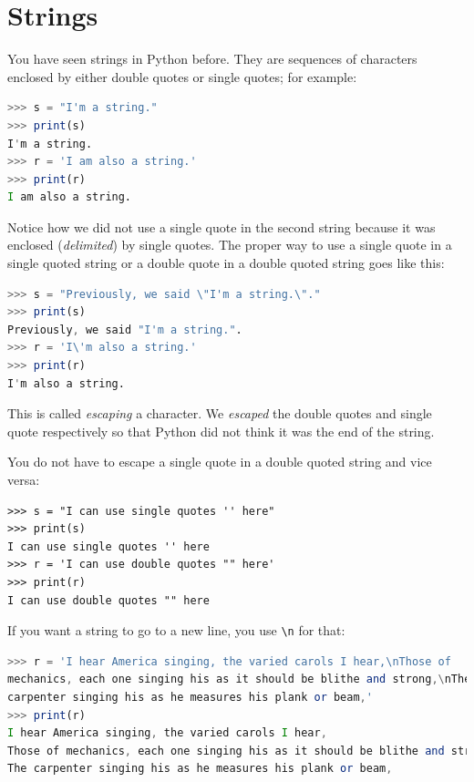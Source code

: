 \documentclass[11pt]{cselabheader}
\begin{document}
\pagebreak
\section{Strings}

You have seen strings in Python before. They are sequences of characters
enclosed by either double quotes or single quotes; for example:
\begin{lstlisting}[style=ipython,language=Octave] % string escaping issues with Python style
>>> s = "I'm a string."
>>> print(s)
I'm a string.
>>> r = 'I am also a string.'
>>> print(r)
I am also a string.
\end{lstlisting}

Notice how we did not use a single quote in the second string because it was
enclosed (\emph{delimited}) by single quotes. The proper way to use a single
quote in a single quoted string or a double quote in a double quoted string
goes like this:
\begin{lstlisting}[style=ipython,language=Octave]
>>> s = "Previously, we said \"I'm a string.\"."
>>> print(s)
Previously, we said "I'm a string.".
>>> r = 'I\'m also a string.'
>>> print(r)
I'm also a string.
\end{lstlisting}
This is called \emph{escaping} a character. We \emph{escaped} the double quotes
and single quote respectively so that Python did not think it was the end of
the string.

You do not have to escape a single quote in a double quoted string and vice
versa:
\begin{lstlisting}[style=ipython]
>>> s = "I can use single quotes '' here"
>>> print(s)
I can use single quotes '' here
>>> r = 'I can use double quotes "" here'
>>> print(r)
I can use double quotes "" here
\end{lstlisting}

If you want a string to go to a new line, you use \lstinline!\n! for that:
\begin{lstlisting}[style=ipython,language=Octave,caption={Excerpt of I Hear
America Singing by Walt Whitman}]
>>> r = 'I hear America singing, the varied carols I hear,\nThose of 
mechanics, each one singing his as it should be blithe and strong,\nThe 
carpenter singing his as he measures his plank or beam,'
>>> print(r)
I hear America singing, the varied carols I hear,
Those of mechanics, each one singing his as it should be blithe and strong,
The carpenter singing his as he measures his plank or beam,
\end{lstlisting}
\end{document}
